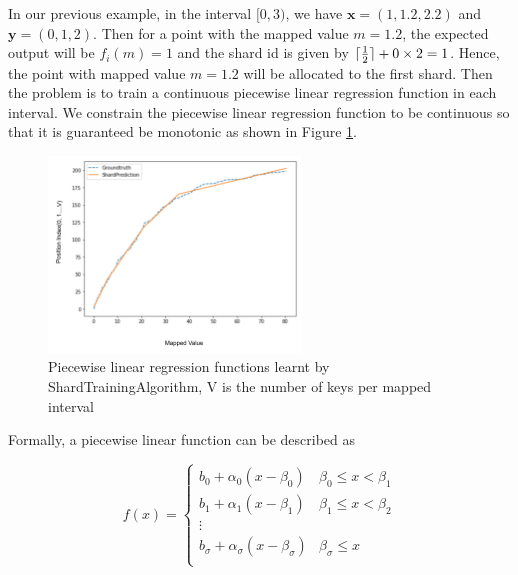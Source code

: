 \begin{mscexample}
	In our previous example, in the interval $[0,3)$, we have $\boldsymbol{x}=(1,1.2,2.2)$ and $\boldsymbol{y}=(0,1,2)$. Then for a point with the mapped value $m=1.2$, the expected output will be $f_i(m)=1$ and the shard id is given by $\lceil\frac{1}{2}\rceil+0\times 2=1$. Hence, the point with mapped value $m=1.2$ will be allocated to the first shard. Then the problem is to train a continuous piecewise linear regression function in each interval. We constrain the piecewise linear regression function to be continuous so that it is guaranteed be monotonic as shown in Figure \ref{shardPrediction}.
\end{mscexample}

\begin{figure}[t]
    \centering
\includegraphics[width=0.6\textwidth]{graphs/implementation/shardPrediction.pdf}
    \caption{Piecewise linear regression functions learnt by ShardTrainingAlgorithm, V is the number of keys per mapped interval}
     
    \label{shardPrediction}
\end{figure}
Formally, a piecewise linear function can be described as 

\begin{equation}
\label{piecewise_linear_function}
	f(x)= \begin{cases} 
      b_0+\alpha_0(x-\beta_0) & \beta_0\leq x < \beta_1 \\
      b_1+\alpha_1(x-\beta_1) &  \beta_1\leq x < \beta_2 \\
      \vdots \\
      b_\sigma+\alpha_\sigma(x-\beta_\sigma) &  \beta_\sigma\leq x \\
   \end{cases}
\end{equation}

